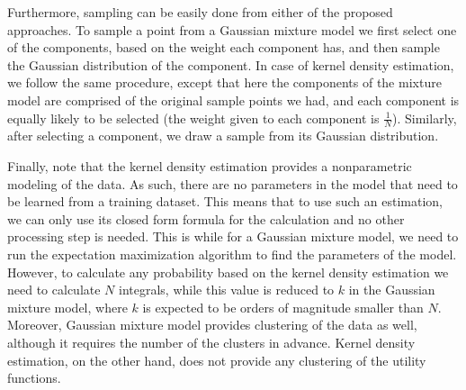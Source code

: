 Furthermore, sampling can be easily done from either of the proposed approaches. To sample a point from a Gaussian mixture model we first select one of the components, based on the weight each component has, and then sample the Gaussian distribution of the component. In case of kernel density estimation, we follow the same procedure, except that here the components of the mixture model are comprised of the original sample points we had, and each component is equally likely to be selected (the weight given to each component is $\frac{1}{N}$). Similarly, after selecting a component, we draw a sample from its Gaussian distribution. 

Finally, note that the kernel density estimation provides a nonparametric modeling of the data. As such, there are no parameters in the model that need to be learned from a training dataset. This means that to use such an estimation, we can only use its closed form formula for the calculation and no other processing step is needed. This is while for a Gaussian mixture model, we need to run the expectation maximization algorithm to find the parameters of the model. However, to calculate any probability based on the kernel density estimation we need to calculate $N$ integrals, while this value is reduced to $k$ in the Gaussian mixture model, where $k$ is expected to be orders of magnitude smaller than $N$. Moreover, Gaussian mixture model provides clustering of the data as well, although it requires the number of the clusters in advance. Kernel density estimation, on the other hand, does not provide any clustering of the utility functions. 






